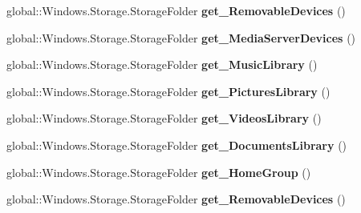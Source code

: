 \begin{DoxyCompactItemize}
global\+::\+Windows.\+Storage.\+Storage\+Folder {\bfseries get\+\_\+\+Removable\+Devices} ()
\item 
\mbox{\label{interface_windows_1_1_storage_1_1_i_known_folders_statics_af7ac66278db4629c0fb06db6a4c43813}} 
global\+::\+Windows.\+Storage.\+Storage\+Folder {\bfseries get\+\_\+\+Media\+Server\+Devices} ()
\item 
\mbox{\label{interface_windows_1_1_storage_1_1_i_known_folders_statics_adcd49c72e55a38fd059c899befb787e3}} 
global\+::\+Windows.\+Storage.\+Storage\+Folder {\bfseries get\+\_\+\+Music\+Library} ()
\item 
\mbox{\label{interface_windows_1_1_storage_1_1_i_known_folders_statics_a9b9ec6853cba04e273a03844185f6a2a}} 
global\+::\+Windows.\+Storage.\+Storage\+Folder {\bfseries get\+\_\+\+Pictures\+Library} ()
\item 
\mbox{\label{interface_windows_1_1_storage_1_1_i_known_folders_statics_a4e094bf4626dc4a6a6cabddd24d74062}} 
global\+::\+Windows.\+Storage.\+Storage\+Folder {\bfseries get\+\_\+\+Videos\+Library} ()
\item 
\mbox{\label{interface_windows_1_1_storage_1_1_i_known_folders_statics_a13665295b51c3f4818fa4670e5c6a652}} 
global\+::\+Windows.\+Storage.\+Storage\+Folder {\bfseries get\+\_\+\+Documents\+Library} ()
\item 
\mbox{\label{interface_windows_1_1_storage_1_1_i_known_folders_statics_a3873e49e2ba9b30c2e9454dc846f4fdd}} 
global\+::\+Windows.\+Storage.\+Storage\+Folder {\bfseries get\+\_\+\+Home\+Group} ()
\item 
\mbox{\label{interface_windows_1_1_storage_1_1_i_known_folders_statics_a82d93b3f375e9c0c78a55429b4bb9b4b}} 
global\+::\+Windows.\+Storage.\+Storage\+Folder {\bfseries get\+\_\+\+Removable\+Devices} ()
\item 

\end{DoxyCompactItemize}
